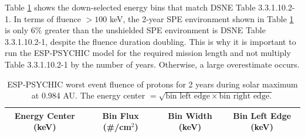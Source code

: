 \documentclass{hitec}
\begin{document}
Table \ref{tab:ESP-PSYCHIC_2-year_subL1} shows the down-selected energy bins that match DSNE Table 3.3.1.10.2-1. In terms of fluence $> 100$ keV, the 2-year SPE environment shown in Table \ref{tab:ESP-PSYCHIC_2-year_subL1} is only $6\%$ greater than the unshielded SPE environment is DSNE Table 3.3.1.10.2-1, despite the fluence duration doubling. This is why it is important to run the ESP-PSYCHIC model for the required mission length and not multiply Table 3.3.1.10.2-1 by the number of years. Otherwise, a large overestimate occurs. 

\begin{table}[!h]\centering
	\caption{ESP-PSYCHIC worst event fluence of protons for 2 years during solar maximum at 0.984 AU. The energy center $=\sqrt{\text{bin left edge}\times\text{bin right edge}.}$ }\label{tab:ESP-PSYCHIC_2-year_subL1}
	\begin{tabular}{|c | c | c | c |}\hline
		Energy Center (keV) & Bin Flux (\#/cm$^2$) & Bin Width (keV) & Bin Left Edge (keV) \\\hline


\end{tabular}
\end{table}
\end{document}
